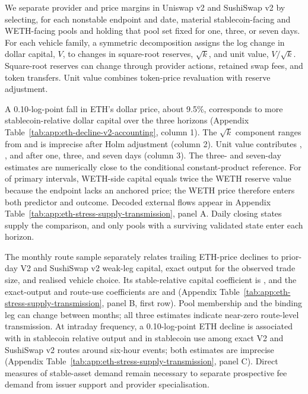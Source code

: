 We separate provider and price margins in Uniswap v2 and SushiSwap v2 by selecting, for each nonstable endpoint and date, material stablecoin-facing and WETH-facing pools and holding that pool set fixed for one, three, or seven days. For each vehicle family, a symmetric decomposition assigns the log change in dollar capital, $V$, to changes in square-root reserves, $\sqrt{k}$, and unit value, $V/\sqrt{k}$. Square-root reserves can change through provider actions, retained swap fees, and token transfers. Unit value combines token-price revaluation with reserve adjustment.

A 0.10-log-point fall in ETH's dollar price, about 9.5\%, corresponds to \EthVTwoAccountingCapitalApproxPercentRange{} more stablecoin-relative dollar capital over the three horizons (Appendix Table~\ref{tab:app:eth-decline-v2-accounting}, column 1). The $\sqrt{k}$ component ranges from \EthVTwoAccountingQuantityApproxPercentRange{} and is imprecise after Holm adjustment (column 2). Unit value contributes \EthVTwoAccountingUnitValueOneDayEffectApproxPercent{}, \EthVTwoAccountingUnitValueThreeDayEffectApproxPercent{}, and \EthVTwoAccountingUnitValueSevenDayEffectApproxPercent{} after one, three, and seven days (column 3). The three- and seven-day estimates are numerically close to the conditional \EthVTwoAccountingUnitValueBenchmarkApproxPercent{} constant-product reference. For \EthVTwoAccountingSinglePricedEndpointShare{} of primary intervals, WETH-side capital equals twice the WETH reserve value because the endpoint lacks an anchored price; the WETH price therefore enters both predictor and outcome. Decoded external flows appear in Appendix Table~\ref{tab:app:eth-stress-supply-transmission}, panel A. Daily closing states supply the comparison, and only pools with a surviving validated state enter each horizon.

The monthly route sample separately relates trailing ETH-price declines to prior-day V2 and SushiSwap v2 weak-leg capital, exact output for the observed trade size, and realised vehicle choice. Its stable-relative capital coefficient is \EthStressDeclineRelativeDepthEffect{}, and the exact-output and route-use coefficients are \EthStressDeclineOutputEffect{} and \EthStressDeclineChoiceEffect{} (Appendix Table~\ref{tab:app:eth-stress-supply-transmission}, panel B, first row). Pool membership and the binding leg can change between months; all three estimates indicate near-zero route-level transmission. At intraday frequency, a 0.10-log-point ETH decline is associated with \EthStressIntradayOutputEffect{} in stablecoin relative output and \EthStressIntradayChoiceEffect{} in stablecoin use among \EthStressIntradayN{} exact V2 and SushiSwap v2 routes around \EthStressIntradayEvents{} six-hour events; both estimates are imprecise (Appendix Table~\ref{tab:app:eth-stress-supply-transmission}, panel C). Direct measures of stable-asset demand remain necessary to separate prospective fee demand from issuer support and provider specialisation.

